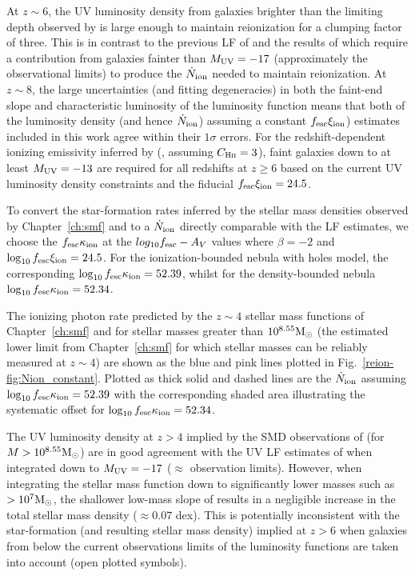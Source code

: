 At $z\sim6$, the UV luminosity density from galaxies brighter than the limiting depth observed by \citet{2015ApJ...803...34B} is large enough to maintain reionization for a clumping factor of three. This is in contrast to the previous LF of \citet{Anonymous:96uKWdy6} and the results of \citet{Finkelstein:2014ub} which require a contribution from galaxies fainter than $M_{\rm{UV}} = -17$ (approximately the observational limits) to produce the $\dot{N}_{\rm{ion}}$ needed to maintain reionization. At $z\sim8$, the large uncertainties (and fitting degeneracies) in both the faint-end slope and characteristic luminosity of the luminosity function means that both of the luminosity density (and hence $\dot{N}_{\rm{ion}}$) assuming a constant $f_{\rm{esc}}\xi_{\rm{ion}}$) estimates included in this work agree within their $1\sigma$ errors. For the redshift-dependent ionizing emissivity inferred by \citeauthor{Bouwens:2015tm} (\citeyear{Bouwens:2015tm}, assuming $C_{\textsc{Hii}} = 3$), faint galaxies down to at least $M_{\rm{UV}} = -13$ are required for all redshifts at $z \geq 6$ based on the current UV luminosity density constraints and the fiducial $f_{\rm{esc}}\xi_{\rm{ion}} = 24.5$.

To convert the star-formation rates inferred by the stellar mass densities observed by Chapter~\ref{ch:smf} and \citet{Grazian:2014vx} to a $\dot{N}_{\rm{ion}}$ directly comparable with the LF estimates, we choose the $f_{\rm{esc}}\kappa_{\rm{ion}}$ at the $log_{10}f_{\rm{esc}}-A_{V}$ values where $\beta = -2$ and $\log_{10} f_{\rm{esc}}\xi_{\rm{ion}} = 24.5$. For the ionization-bounded nebula with holes model, the corresponding $\log_{10} f_{\rm{esc}}\kappa_{\rm{ion}} =  52.39$, whilst for the density-bounded nebula $\log_{10} f_{\rm{esc}}\kappa_{\rm{ion}} = 52.34$.

The ionizing photon rate predicted by the $z\sim4$ stellar mass functions of Chapter~\ref{ch:smf} and \citet{Grazian:2014vx} for stellar masses greater than $10^{8.55}\/\rm{M}_{\odot}$ (the estimated lower limit from Chapter~\ref{ch:smf} for which stellar masses can be reliably measured at $z\sim4$) are shown as the blue and pink lines plotted in Fig.~\ref{reion-fig:Nion_constant}. Plotted as thick solid and dashed lines are the $\dot{N}_{\rm{ion}}$ assuming $\log_{10} f_{\rm{esc}}\kappa_{\rm{ion}} = 52.39$ with the corresponding shaded area illustrating the systematic offset for $\log_{10} f_{\rm{esc}}\kappa_{\rm{ion}} = 52.34$. 

The UV luminosity density at $z > 4$ implied by the SMD observations of \citet{Grazian:2014vx} (for $M>10^{8.55}\/\rm{M}_{\odot}$) are in good agreement with the UV LF estimates of \citet{Finkelstein:2014ub} when integrated down to $M_{\rm{UV}} = -17$ ($\approx$ observation limits). However, when integrating the stellar mass function down to significantly lower masses such as $> 10^{7} \rm{M}_{\odot}$, the shallower low-mass slope of \citep{Grazian:2014vx} results in a negligible increase in the total stellar mass density ($\approx 0.07$ dex). This is potentially inconsistent with the star-formation (and resulting stellar mass density) implied at $z > 6$ when galaxies from below the current observations limits of the luminosity functions are taken into account (open plotted symbols). 

